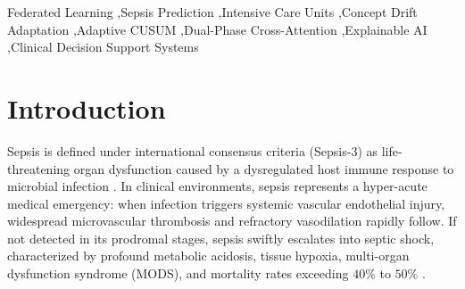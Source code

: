 \documentclass[final,5p,times,twocolumn]{elsarticle}
\begin{document}
\begin{frontmatter}
\begin{abstract}
0.7820--0.8026), highest AUPRC of 	extbf{0.1043}, lowest ECE of 	extbf{0.0902}, and lowest Brier score of 	extbf{0.0548}. Paired cluster bootstrap testing confirms statistically equivalent discrimination to centralized BiLSTM ($P = .176$) and personalized Ditto ($P = .459$) while delivering superior probability reliability. Depending on clinical deployment requirements, FPDAF supports flexible operating modes, ranging from an \textbf{Early Bedside Screening mode} ($\tau=0.08$, Sensitivity 80.15\%, Specificity 63.85\%) to a \textbf{High-Confidence Rule-In mode} ($\tau=0.65$, Accuracy 96.20\%, Specificity 97.80\%). In a theoretical 50-round deployment model, CSSP achieves up to 38.0\% communication savings (1.52~GB vs. 2.48~GB in Ditto), while empirical 6-round logs demonstrated a 0.38\% reduction during selective freeze rounds. Paired with an operational point-of-care Clinical Decision Support System (CDSS) providing temporal window attributions, physiological feature saliency via Integrated Gradients, and counterfactual intervention simulation with a cohort mean early warning lead time of \textbf{4.98 hours} (up to 5.8 hours in exemplar cases), FPDAF provides an empirically grounded, privacy-preserving foundation for decentralized early sepsis surveillance.
\end{abstract}

\begin{keyword}
Federated Learning \sep Sepsis Prediction \sep Intensive Care Units \sep Concept Drift Adaptation \sep Adaptive CUSUM \sep Dual-Phase Cross-Attention \sep Explainable AI \sep Clinical Decision Support Systems
\end{keyword}

\end{frontmatter}

\section{Introduction}
Sepsis is defined under international consensus criteria (Sepsis-3) as life-threatening organ dysfunction caused by a dysregulated host immune response to microbial infection \cite{singer2016sepsis3}. In clinical environments, sepsis represents a hyper-acute medical emergency: when infection triggers systemic vascular endothelial injury, widespread microvascular thrombosis and refractory vasodilation rapidly follow. If not detected in its prodromal stages, sepsis swiftly escalates into septic shock, characterized by profound metabolic acidosis, tissue hypoxia, multi-organ dysfunction syndrome (MODS), and mortality rates exceeding $40\%$ to $50\%$ \cite{evans2021surviving,dusing2025sepsis}. 
\end{document}

